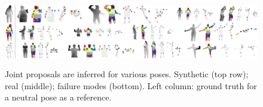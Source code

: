\begin{figure}
	[h] \centering 
	\includegraphics[height=3cm]{figures/content/ni-pose.jpg} \caption{Joint proposals are inferred for various poses. Synthetic (top row); real (middle); failure modes (bottom). Left column: ground truth for a neutral pose as a reference. \cite{2} } \label{fg:ni:pose} 
\end{figure}
